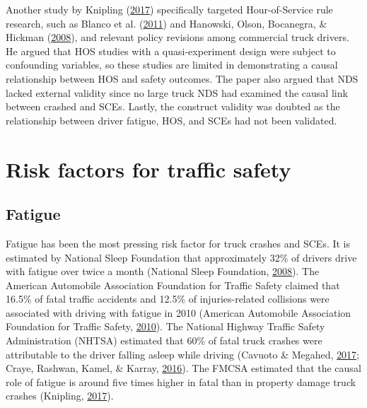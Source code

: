 \documentclass[12pt]{book}
\numberwithin{equation}{chapter}
\begin{document}
Another study by Knipling (\protect\hyperlink{ref-knipling2017threats}{2017}) specifically targeted Hour-of-Service rule research, such as Blanco et al. (\protect\hyperlink{ref-blanco2011impact}{2011}) and Hanowski, Olson, Bocanegra, \& Hickman (\protect\hyperlink{ref-hanowski2008analysis}{2008}), and relevant policy revisions among commercial truck drivers. He argued that HOS studies with a quasi-experiment design were subject to confounding variables, so these studies are limited in demonstrating a causal relationship between HOS and safety outcomes. The paper also argued that NDS lacked external validity since no large truck NDS had examined the causal link between crashed and SCEs. Lastly, the construct validity was doubted as the relationship between driver fatigue, HOS, and SCEs had not been validated.

\hypertarget{risk-factors-for-traffic-safety}{%
\section{Risk factors for traffic safety}\label{risk-factors-for-traffic-safety}}

\hypertarget{fatigue}{%
\subsection{Fatigue}\label{fatigue}}

Fatigue has been the most pressing risk factor for truck crashes and SCEs. It is estimated by National Sleep Foundation that approximately 32\% of drivers drive with fatigue over twice a month (National Sleep Foundation, \protect\hyperlink{ref-nsleepf}{2008}). The American Automobile Association Foundation for Traffic Safety claimed that 16.5\% of fatal traffic accidents and 12.5\% of injuries-related collisions were associated with driving with fatigue in 2010 (American Automobile Association Foundation for Traffic Safety, \protect\hyperlink{ref-aaafoundation}{2010}). The National Highway Traffic Safety Administration (NHTSA) estimated that 60\% of fatal truck crashes were attributable to the driver falling asleep while driving (Cavuoto \& Megahed, \protect\hyperlink{ref-cavuoto2017understanding}{2017}; Craye, Rashwan, Kamel, \& Karray, \protect\hyperlink{ref-craye2016multi}{2016}). The FMCSA estimated that the causal role of fatigue is around five times higher in fatal than in property damage truck crashes (Knipling, \protect\hyperlink{ref-knipling2017threats}{2017}).
\end{document}
